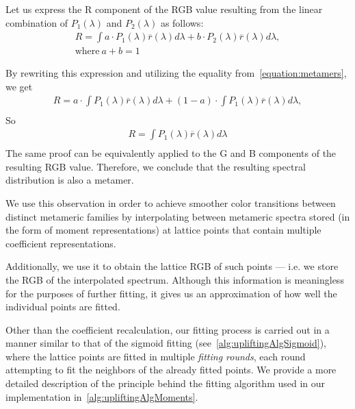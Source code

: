 Let us express the R component of the RGB value resulting from the linear combination of $P_1(\lambda)$ and $P_2(\lambda)$ as follows:
\begin{equation}
\begin{aligned}
R = \int a \cdot P_1(\lambda)\overline{r}(\lambda)d\lambda + 
b \cdot P_2(\lambda)\overline{r}(\lambda)d\lambda,\\
\text{where}\ a + b = 1
\end{aligned}
\end{equation}

By rewriting this expression and utilizing the equality from~\cref{equation:metamers}, we get
\begin{equation*}
\begin{aligned}
R = a \cdot \int P_1(\lambda)\overline{r}(\lambda)d\lambda +
(1-a) \cdot \int P_1(\lambda)\overline{r}(\lambda)d\lambda,\\
\end{aligned}
\end{equation*}
So
\begin{equation*}
\begin{aligned}
R = \int P_1(\lambda)\overline{r}(\lambda)d\lambda\\
\end{aligned}
\end{equation*}
The same proof can be equivalently applied to the G and B components of the resulting RGB value. Therefore, we conclude that the resulting spectral distribution is also a metamer.

We use this observation in order to achieve smoother color transitions between distinct metameric families by interpolating between metameric spectra stored (in the form of moment representations) at lattice points that contain multiple coefficient representations.

Additionally, we use it to obtain the lattice RGB of such points --- i.e. we store the RGB of the interpolated spectrum. Although this information is meaningless for the purposes of further fitting, it gives us an approximation of how well the individual points are fitted.

Other than the coefficient recalculation, our fitting process is carried out in a manner similar to that of the sigmoid fitting (see~\cref{alg:upliftingAlgSigmoid}), where the lattice points are fitted in multiple \emph{fitting rounds}, each round attempting to fit the neighbors of the already fitted points. We provide a more detailed description of the principle behind the fitting algorithm used in our implementation in~\cref{alg:upliftingAlgMoments}.

